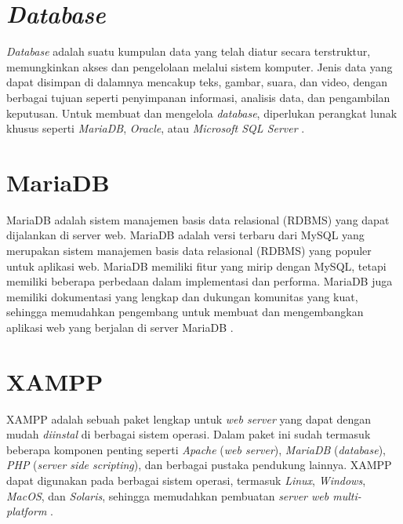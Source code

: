 \section{\textit{Database}}
\textit{Database} adalah suatu kumpulan data yang telah diatur secara terstruktur, memungkinkan akses dan pengelolaan melalui sistem komputer. Jenis data yang dapat disimpan di dalamnya mencakup teks, gambar, suara, dan video, dengan berbagai tujuan seperti penyimpanan informasi, analisis data, dan pengambilan keputusan. Untuk membuat dan mengelola \textit{database}, diperlukan perangkat lunak khusus seperti \textit{MariaDB}, \textit{Oracle}, atau \textit{Microsoft SQL Server} \cite{Cowls2021ADB}.

\section{MariaDB}
MariaDB adalah sistem manajemen basis data relasional (RDBMS) yang dapat dijalankan di server web. MariaDB adalah versi terbaru dari MySQL yang merupakan sistem manajemen basis data relasional (RDBMS) yang populer untuk aplikasi web. MariaDB memiliki fitur yang mirip dengan MySQL, tetapi memiliki beberapa perbedaan dalam implementasi dan performa. MariaDB juga memiliki dokumentasi yang lengkap dan dukungan komunitas yang kuat, sehingga memudahkan pengembang untuk membuat dan mengembangkan aplikasi web yang berjalan di server MariaDB \cite{mariadb2024}.


\section{XAMPP}
XAMPP adalah sebuah paket lengkap untuk \textit{web server} yang dapat dengan mudah \textit{diinstal} di berbagai sistem operasi. Dalam paket ini sudah termasuk beberapa komponen penting seperti \textit{Apache} (\textit{web server}), \textit{MariaDB} (\textit{database}), \textit{PHP} (\textit{server side scripting}), dan berbagai pustaka pendukung lainnya. XAMPP dapat digunakan pada berbagai sistem operasi, termasuk \textit{Linux}, \textit{Windows}, \textit{MacOS}, dan \textit{Solaris}, sehingga memudahkan pembuatan \textit{server web multi-platform} \cite{pakpahan2020sistem}.

